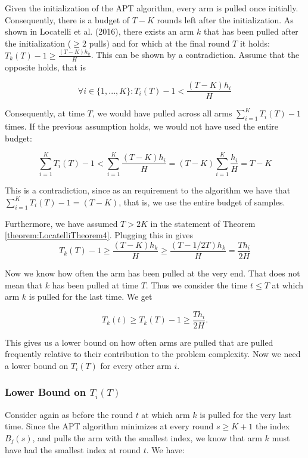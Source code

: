 \documentclass[11pt,]{article}
\begin{document}
Given the initialization of the APT algorithm, every arm is pulled once
initially. Consequently, there is a budget of \(T-K\) rounds left after
the initialization. As shown in Locatelli et al. (2016), there exists an
arm \(k\) that has been pulled after the initialization (\(\geq 2\)
pulls) and for which at the final round \(T\) it holds:
\(T_k(T) - 1 \geq \frac{(T-K)h_k}{H}\). This can be shown by a
contradiction. Assume that the opposite holds, that is

\[
\forall i \in \{1,...,K\}: T_i(T) - 1 < \frac{(T-K)h_i}{H}
\]

Consequently, at time \(T\), we would have pulled across all arms
\(\sum_{i=1}^KT_i(T)-1\) times. If the previous assumption holds, we
would not have used the entire budget:

\[
\sum_{i=1}^K T_i(T)-1 < \sum_{i=1}^K \frac{(T-K)h_i}{H} = (T-K)\sum_{i=1}^K \frac{h_i}{H} = T-K
\]

This is a contradiction, since as an requirement to the algorithm we
have that \(\sum_{i=1}^K T_i(T)-1 = (T-K)\), that is, we use the entire
budget of samples.

Furthermore, we have assumed \(T>2K\) in the statement of Theorem
\ref{theorem:LocatelliTheorem4}. Plugging this in gives \[
T_k(T) - 1 \geq \frac{(T-K)h_k}{H} \geq \frac{(T-1/2T)h_k}{H} = \frac{Th_i}{2H}
\]

Now we know how often the arm has been pulled at the very end. That does
not mean that \(k\) has been pulled at time \(T\). Thus we consider the
time \(t \leq T\) at which arm \(k\) is pulled for the last time. We get

\[
T_k(t) \geq T_k(T) - 1 \geq \frac{Th_i}{2H}.
\]

This gives us a lower bound on how often arms are pulled that are pulled
frequently relative to their contribution to the problem complexity. Now
we need a lower bound on \(T_i(T)\) for every other arm \(i\).

\subsubsection{\texorpdfstring{Lower Bound on
\(T_i(T)\)}{Lower Bound on T\_i(T)}}\label{lower-bound-on-t_it}

Consider again as before the round \(t\) at which arm \(k\) is pulled
for the very last time. Since the APT algorithm minimizes at every round
\(s \geq K+1\) the index \(B_j(s)\), and pulls the arm with the smallest
index, we know that arm \(k\) must have had the smallest index at round
\(t\). We have:
\end{document}
